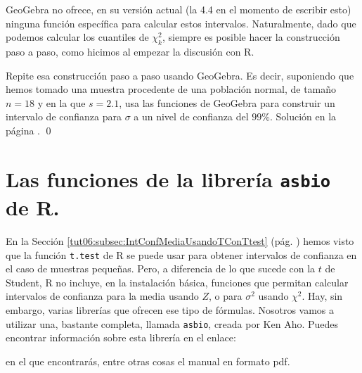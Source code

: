 \documentclass[10pt,a4paper]{article}\usepackage[]{graphicx}\usepackage[]{color}
\newcounter {cont01}
\begin{document}
GeoGebra no ofrece, en su versión actual (la 4.4 en el momento de escribir esto) ninguna función específica para calcular estos intervalos. Naturalmente, dado que podemos calcular los cuantiles de $\chi^2_k$, siempre es posible hacer la construcción paso a paso, como hicimos al empezar la discusión con R.

\begin{ejercicio}
\label{tut06:ejercicio23}
Repite esa construcción paso a paso usando GeoGebra. Es decir, suponiendo que hemos tomado una muestra procedente de una población normal, de tamaño $n=18$ y en la que  $s= 2.1$, usa las funciones de GeoGebra para construir un intervalo de confianza para $\sigma$ a un nivel de confianza del $99\%$. Solución en la página \pageref{tut06:ejercicio23:sol}.
\qed
\end{ejercicio}

\section{Las funciones de la librería {\tt asbio} de R.}
\label{tut06:sec:LibreriaAsbio}

En la Sección \ref{tut06:subsec:IntConfMediaUsandoTConTtest} (pág. \pageref{tut06:subsec:IntConfMediaUsandoTConTtest}) hemos visto que la función {\tt t.test} de R se puede usar para obtener intervalos de confianza en el caso de muestras pequeñas. Pero, a diferencia de lo que sucede con la $t$ de Student, R no incluye, en la instalación básica,  funciones que permitan calcular intervalos de confianza para la media usando $Z$, o para $\sigma^2$ usando $\chi^2$. Hay, sin embargo,  varias librerías que ofrecen ese tipo de fórmulas. Nosotros vamos a utilizar una, bastante completa, llamada {\tt asbio}, creada por Ken Aho. Puedes encontrar información sobre esta librería en el enlace:
\begin{center}
\end{center}
en el que encontrarás, entre otras cosas el manual en formato pdf.
\end{document}
